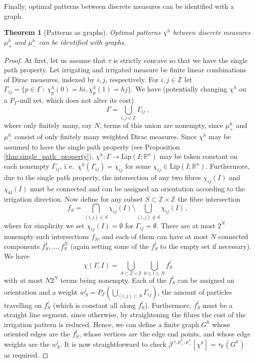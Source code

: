 \documentclass[10pt,a4paper,oneside,final]{article}
\newcommand{\R}{{\mathbb{R}}}
\newcommand{\Z}{{\mathbb{Z}}}
\newcommand{\Lip}{\mathrm{Lip}}
\newcommand{\reSpace}{\Gamma}
\newcommand{\reMeasure}{P_{\reSpace}}
\newcommand{\JEn}{{\mathcal{J}}}
\newcommand{\JEnXia}[1][\tau]{#1_{\mathrm{F}}}%
\numberwithin{equation}{section}
\theoremstyle{plain}
\newtheorem{theorem}{Theorem}[section]
\theoremstyle{definition}
\theoremstyle{remark}
\begin{document}
{Finally, optimal patterns between discrete measures can be identified with a graph.

\begin{theorem}[Patterns as graphs]\label{thm:patternsAsGraphs}
Optimal patterns $\chi^h$ between discrete measures $\mu_+^h$ and $\mu_-^h$ can be identified with graphs.
\end{theorem}
\begin{proof}
At first, let us assume that $\tau$ is strictly concave so that we have the single path property.
Let irrigating and irrigated measure be finite linear combinations of Dirac measures, indexed by $i,j$, respectively.
For $i,j\in\Z$ let $\reSpace_{ij} = \{p \in \reSpace \ : \ \chi_p^h(0)=hi, \chi_p^h(1)=hj\}$.
We have (potentially changing $\chi^h$ on a $\reMeasure$-null set, which does not alter its cost)
\begin{displaymath}
\reSpace=\bigcup_{i,j\in\Z}\reSpace_{ij}\,,
\end{displaymath}
where only finitely many, say $N$, terms of this union are nonempty,
since $\mu_+^h$ and $\mu_-^h$ consist of only finitely many weighted Dirac measures.
Since $\chi^h$ may be assumed to have the single path property (see Proposition\,\ref{thm:single_path_property}),
$\chi^h:\reSpace\to \Lip(I;\R^n)$ may be taken constant on each nonempty $\reSpace_{ij}$, i.\,e.\ $\chi^h(\reSpace_{ij})=\chi_{ij}$ for some $\chi_{ij}\in \Lip(I;\R^n)$.
Furthermore, due to the single path property, the intersection of any two fibres $\chi_{ij}(I)$ and $\chi_{kl}(I)$
must be connected and can be assigned an orientation according to the irrigation direction.
Now define for any subset $S\subset\Z\times\Z$ the fibre intersection
\begin{displaymath}
f_S=\bigcap_{(i,j)\in S}\chi_{ij}(I)\setminus\bigcup_{(i,j)\notin S}\chi_{ij}(I)\,,
\end{displaymath}
where for simplicity we set $\chi_{ij}(I)=\emptyset$ for $\reSpace_{ij}=\emptyset$.
There are at most $2^N$ nonempty such intersections $f_S$, and each of them can have at most $N$ connected components $f_S^1,\ldots,f_S^N$
(again setting some of the $f_S^l$ to the empty set if necessary).
We have
\begin{displaymath}
\chi(\reSpace,I)=\bigcup_{S\subset\Z\times\Z}\bigcup_{0\leq l\leq N}f_S^l
\end{displaymath}
with at most $N2^N$ terms being nonempty.
Each of the $f_S^l$ can be assigned an orientation and a weight $w_S^l=\reMeasure\left(\bigcup_{(i,j)\subset S}\reSpace_{ij}\right)$,
the amount of particles travelling on $f_S^l$ (which is constant all along $f_S^l$).
Furthermore, $f_S^l$ must be a straight line segment, since otherwise, by straightening the fibres the cost of the irrigation pattern is reduced.
Hence, we can define a finite graph $G^h$ whose oriented edges are the $f_S^l$, whose vertices are the edge end points, and whose edge weights are the $w_S^l$.
It is now straightforward to check $\JEn^{\tau,\mu_+^h,\mu_-^h}[\chi^h]=\JEnXia(G^h)$ as required.


\end{proof}}
\end{document}
